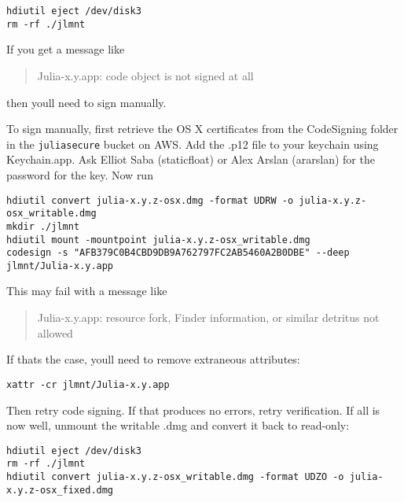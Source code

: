 \begin{lstlisting}
hdiutil eject /dev/disk3
rm -rf ./jlmnt
\end{lstlisting}



If you get a message like



\begin{quote}
Julia-x.y.app: code object is not signed at all

\end{quote}


then you{\textquotesingle}ll need to sign manually.



To sign manually, first retrieve the OS X certificates from the CodeSigning folder in the \texttt{juliasecure} bucket on AWS. Add the .p12 file to your keychain using Keychain.app. Ask Elliot Saba (staticfloat) or Alex Arslan (ararslan) for the password for the key. Now run




\begin{lstlisting}
hdiutil convert julia-x.y.z-osx.dmg -format UDRW -o julia-x.y.z-osx_writable.dmg
mkdir ./jlmnt
hdiutil mount -mountpoint julia-x.y.z-osx_writable.dmg
codesign -s "AFB379C0B4CBD9DB9A762797FC2AB5460A2B0DBE" --deep jlmnt/Julia-x.y.app
\end{lstlisting}



This may fail with a message like



\begin{quote}
Julia-x.y.app: resource fork, Finder information, or similar detritus not allowed

\end{quote}


If that{\textquotesingle}s the case, you{\textquotesingle}ll need to remove extraneous attributes:




\begin{lstlisting}
xattr -cr jlmnt/Julia-x.y.app
\end{lstlisting}



Then retry code signing. If that produces no errors, retry verification. If all is now well, unmount the writable .dmg and convert it back to read-only:




\begin{lstlisting}
hdiutil eject /dev/disk3
rm -rf ./jlmnt
hdiutil convert julia-x.y.z-osx_writable.dmg -format UDZO -o julia-x.y.z-osx_fixed.dmg
\end{lstlisting}



